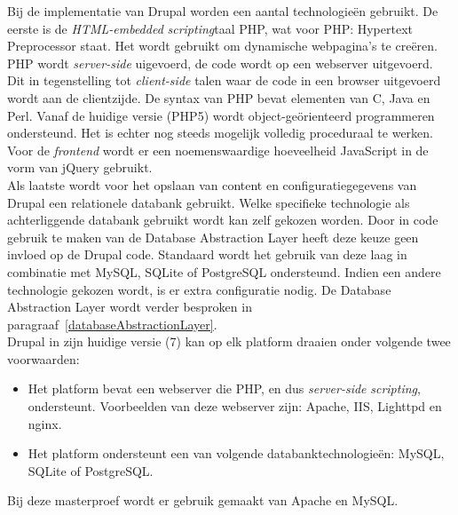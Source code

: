 Bij de implementatie van Drupal worden een aantal technologie\"{e}n gebruikt. De eerste is de \textit{HTML-embedded} \textit{scripting}taal PHP, wat voor PHP: Hypertext Preprocessor staat. Het wordt gebruikt om dynamische webpagina's te cre\"{e}ren. PHP wordt \textit{server-side} uigevoerd, de code wordt op een webserver uitgevoerd. Dit in tegenstelling tot \textit{client-side} talen waar de code in een browser uitgevoerd wordt aan de clientzijde. De syntax van PHP bevat elementen van C, Java en Perl. Vanaf de huidige versie (PHP5) wordt object-ge\"{o}rienteerd programmeren ondersteund. Het is echter nog steeds mogelijk volledig proceduraal te werken.\\

Voor de \textit{frontend} wordt er een noemenswaardige hoeveelheid JavaScript in de vorm van jQuery gebruikt.\\

Als laatste wordt voor het opslaan van content en configuratiegegevens van Drupal een relationele databank gebruikt. Welke specifieke technologie als achterliggende databank gebruikt wordt kan zelf gekozen worden. Door in code gebruik te maken van de Database Abstraction Layer heeft deze keuze geen invloed op de Drupal code. Standaard wordt het gebruik van deze laag in combinatie met MySQL, SQLite of PostgreSQL ondersteund. Indien een andere technologie gekozen wordt, is er extra configuratie nodig. De Database Abstraction Layer wordt verder besproken in paragraaf~\ref{databaseAbstractionLayer}.\\

\noindent
Drupal in zijn huidige versie (7) kan op elk platform draaien onder volgende twee voorwaarden:
\begin{itemize}
\item Het platform bevat een webserver die PHP, en dus \textit{server-side} \textit{scripting}, ondersteunt. Voorbeelden van deze webserver zijn:  Apache, IIS, Lighttpd en nginx.
\item Het platform ondersteunt een van volgende databanktechnologie\"{e}n: MySQL, SQLite of PostgreSQL.
\end{itemize}
Bij deze masterproef wordt er gebruik gemaakt van Apache en MySQL.

